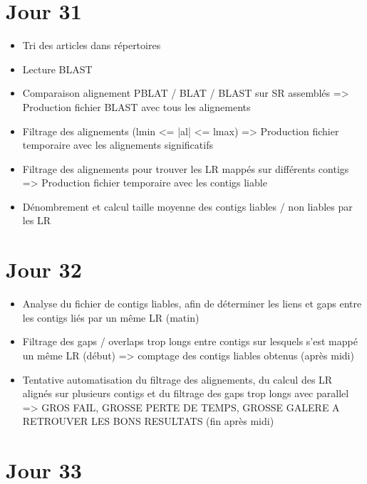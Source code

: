 \documentclass[12pt]{report}
\begin{document}
\section{Jour 31}

\begin{itemize}
	\item Tri des articles dans répertoires
	
	\item Lecture BLAST
	
	\item Comparaison alignement PBLAT / BLAT / BLAST sur SR assemblés => Production fichier BLAST avec tous les alignements
	
	\item Filtrage des alignements (lmin <= |al| <= lmax) => Production fichier temporaire avec les alignements significatifs
	
	\item Filtrage des alignements pour trouver les LR mappés sur différents contigs => Production fichier temporaire avec les contigs liable
	
	\item Dénombrement et calcul taille moyenne des contigs liables / non liables par les LR
\end{itemize}

\section{Jour 32}

\begin{itemize}
	\item Analyse du fichier de contigs liables, afin de déterminer les liens et gaps entre les contigs liés par un même LR (matin)

	\item Filtrage des gaps / overlaps trop longs entre contigs sur lesquels s'est mappé un même LR (début) => comptage des contigs liables
	obtenus (après midi)
	
	\item Tentative automatisation du filtrage des alignements, du calcul des LR alignés sur plusieurs contigs et du filtrage des gaps trop
	longs avec parallel => GROS FAIL, GROSSE PERTE DE TEMPS, GROSSE GALERE A RETROUVER LES BONS RESULTATS (fin après midi)
\end{itemize}

\section{Jour 33}
\end{document}
